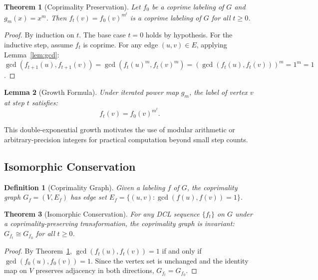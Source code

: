 \documentclass[lettersize,journal]{IEEEtran}
\newtheorem{theorem}{Theorem}
\newtheorem{lemma}[theorem]{Lemma}
\newtheorem{definition}{Definition}
\begin{document}
\begin{theorem}[Coprimality Preservation]
\label{thm:coprime}
Let $f_0$ be a coprime labeling of $G$ and $g_m(x) = x^m$. Then $f_t(v) = f_0(v)^{m^t}$ is a coprime labeling of $G$ for all $t \geq 0$.
\end{theorem}

\begin{proof}
By induction on $t$. The base case $t = 0$ holds by hypothesis. For the inductive step, assume $f_t$ is coprime. For any edge $(u,v) \in E$, applying Lemma~\ref{lem:gcd}: $\gcd(f_{t+1}(u), f_{t+1}(v)) = \gcd(f_t(u)^m, f_t(v)^m) = (\gcd(f_t(u), f_t(v)))^m = 1^m = 1$.
\end{proof}

\begin{lemma}[Growth Formula]
\label{lem:growth}
Under iterated power map $g_m$, the label of vertex $v$ at step $t$ satisfies:
\begin{equation}
f_t(v) = f_0(v)^{m^t}.
\label{eq:growth}
\end{equation}
\end{lemma}

This double-exponential growth motivates the use of modular arithmetic or arbitrary-precision integers for practical computation beyond small step counts.

\subsection{Isomorphic Conservation}

\begin{definition}[Coprimality Graph]
\label{def:coprime_graph}
Given a labeling $f$ of $G$, the \emph{coprimality graph} $G_f = (V, E_f)$ has edge set $E_f = \{(u,v) : \gcd(f(u), f(v)) = 1\}$.
\end{definition}

\begin{theorem}[Isomorphic Conservation]
\label{thm:iso}
For any DCL sequence $\{f_t\}$ on $G$ under a coprimality-preserving transformation, the coprimality graph is invariant: $G_{f_t} \cong G_{f_0}$ for all $t \geq 0$.
\end{theorem}

\begin{proof}
By Theorem~\ref{thm:coprime}, $\gcd(f_t(u), f_t(v)) = 1$ if and only if $\gcd(f_0(u), f_0(v)) = 1$. Since the vertex set is unchanged and the identity map on $V$ preserves adjacency in both directions, $G_{f_t} = G_{f_0}$.
\end{proof}
\end{document}
